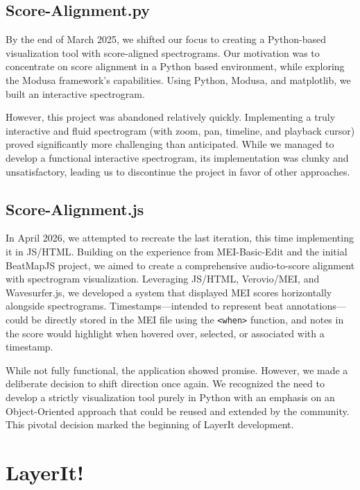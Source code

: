 \subsection{Score-Alignment.py}
By the end of March 2025, we shifted our focus to creating a Python-based visualization tool with score-aligned spectrograms. Our motivation was to concentrate on score alignment in a Python based environment, while exploring the Modusa framework's capabilities. Using Python, Modusa, and matplotlib, we built an interactive spectrogram.

However, this project was abandoned relatively quickly. Implementing a truly interactive and fluid spectrogram (with zoom, pan, timeline, and playback cursor) proved significantly more challenging than anticipated. While we managed to develop a functional interactive spectrogram, its implementation was clunky and unsatisfactory, leading us to discontinue the project in favor of other approaches. 

\subsection{Score-Alignment.js}
In April 2026, we attempted to recreate the last iteration, this time implementing it in JS/HTML. Building on the experience from MEI-Basic-Edit and the initial BeatMapJS project, we aimed to create a comprehensive audio-to-score alignment with spectrogram visualization. Leveraging JS/HTML, Verovio/MEI, and Wavesurfer.js, we developed a system that displayed MEI scores horizontally alongside spectrograms. Timestamps—intended to represent beat annotations—could be directly stored in the MEI file using the \texttt{<when>} function, and notes in the score would highlight when hovered over, selected, or associated with a timestamp.

While not fully functional, the application showed promise. However, we made a deliberate decision to shift direction once again. We recognized the need to develop a strictly visualization tool purely in Python with an emphasis on an Object-Oriented approach that could be reused and extended by the community. This pivotal decision marked the beginning of LayerIt development.

\section{LayerIt!}


